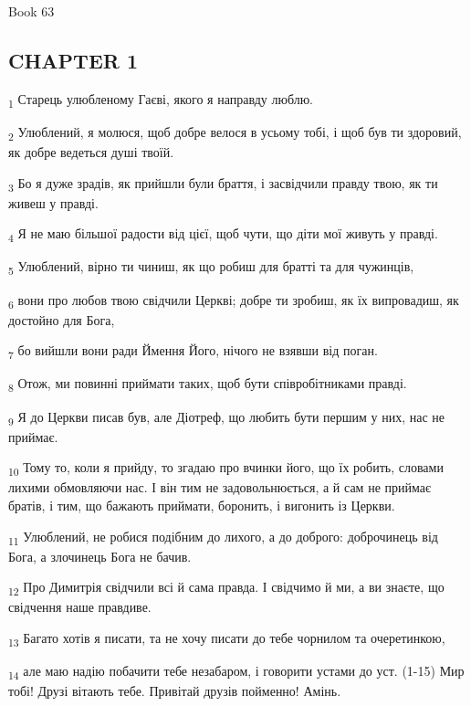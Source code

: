 Book 63
\subsection{CHAPTER 1}
\begin{tcolorbox}
\textsubscript{1} Старець улюбленому Гаєві, якого я направду люблю.
\end{tcolorbox}
\begin{tcolorbox}
\textsubscript{2} Улюблений, я молюся, щоб добре велося в усьому тобі, і щоб був ти здоровий, як добре ведеться душі твоїй.
\end{tcolorbox}
\begin{tcolorbox}
\textsubscript{3} Бо я дуже зрадів, як прийшли були браття, і засвідчили правду твою, як ти живеш у правді.
\end{tcolorbox}
\begin{tcolorbox}
\textsubscript{4} Я не маю більшої радости від цієї, щоб чути, що діти мої живуть у правді.
\end{tcolorbox}
\begin{tcolorbox}
\textsubscript{5} Улюблений, вірно ти чиниш, як що робиш для братті та для чужинців,
\end{tcolorbox}
\begin{tcolorbox}
\textsubscript{6} вони про любов твою свідчили Церкві; добре ти зробиш, як їх випровадиш, як достойно для Бога,
\end{tcolorbox}
\begin{tcolorbox}
\textsubscript{7} бо вийшли вони ради Ймення Його, нічого не взявши від поган.
\end{tcolorbox}
\begin{tcolorbox}
\textsubscript{8} Отож, ми повинні приймати таких, щоб бути співробітниками правді.
\end{tcolorbox}
\begin{tcolorbox}
\textsubscript{9} Я до Церкви писав був, але Діотреф, що любить бути першим у них, нас не приймає.
\end{tcolorbox}
\begin{tcolorbox}
\textsubscript{10} Тому то, коли я прийду, то згадаю про вчинки його, що їх робить, словами лихими обмовляючи нас. І він тим не задовольнюється, а й сам не приймає братів, і тим, що бажають приймати, боронить, і вигонить із Церкви.
\end{tcolorbox}
\begin{tcolorbox}
\textsubscript{11} Улюблений, не робися подібним до лихого, а до доброго: доброчинець від Бога, а злочинець Бога не бачив.
\end{tcolorbox}
\begin{tcolorbox}
\textsubscript{12} Про Димитрія свідчили всі й сама правда. І свідчимо й ми, а ви знаєте, що свідчення наше правдиве.
\end{tcolorbox}
\begin{tcolorbox}
\textsubscript{13} Багато хотів я писати, та не хочу писати до тебе чорнилом та очеретинкою,
\end{tcolorbox}
\begin{tcolorbox}
\textsubscript{14} але маю надію побачити тебе незабаром, і говорити устами до уст. (1-15) Мир тобі! Друзі вітають тебе. Привітай друзів пойменно! Амінь.
\end{tcolorbox}
